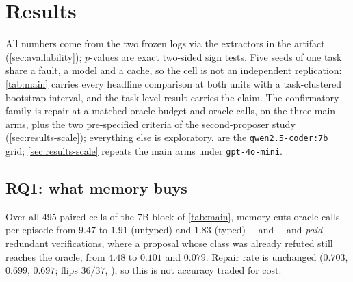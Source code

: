 \section{Results}
\label{sec:results}

All numbers come from the two frozen logs via the extractors in the artifact
(\cref{sec:availability}); $p$-values are exact two-sided sign tests. Five
seeds of one task share a fault, a model and a cache, so the cell is not an
independent replication: \cref{tab:main} carries every headline comparison at
both units with a task-clustered bootstrap interval, and the task-level result
carries the claim. The confirmatory family is repair at a matched oracle budget
and oracle calls, on the three main arms, plus the two pre-specified criteria
of the second-proposer study (\cref{sec:results-scale}); everything else is
exploratory.  are the
\texttt{qwen2.5-coder:7b} grid; \cref{sec:results-scale} repeats the main arms
under \texttt{gpt-4o-mini}.

\subsection{RQ1: what memory buys}
\label{sec:results-cost}



Over all \num{495} paired cells of the 7B block of \cref{tab:main}, memory cuts oracle calls per
episode from $9.47$ to $1.91$ (untyped) and $1.83$ (typed)--- and
---and \emph{paid} redundant verifications, where a proposal whose
class was already refuted still reaches the oracle, from $4.48$ to $0.101$ and
$0.079$. Repair rate is unchanged ($0.703$, $0.699$, $0.697$; flips $36/37$,
), so this is not accuracy traded for cost.

